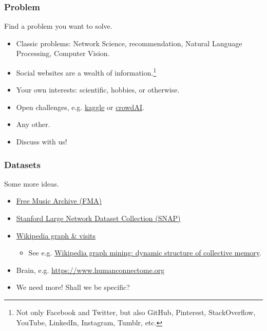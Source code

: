 \documentclass{beamer}
\newcommand{\todo}[1]{{\color{red} #1}}
\begin{document}

\begin{frame}
	\frametitle{Problem}
	\begin{center}
		Find a problem you want to solve.
	\end{center}
	\vfill
	\begin{itemize}
		\item Classic problems: Network Science, recommendation, Natural
			Language Processing, Computer Vision.
		\vfill
		\item Social websites are a wealth of information.\footnote{Not only
			Facebook and Twitter, but also GitHub, Pinterest, StackOverflow,
			YouTube, LinkedIn, Instagram, Tumblr, etc.}
		\vfill
		\item Your own interests: scientific, hobbies, or otherwise.
		\vfill
		\item Open challenges, e.g. \href{https://www.kaggle.com/}{kaggle} or \href{https://www.crowdai.org/}{crowdAI}.
		\vfill
		\item Any other.
		\vfill
		\item Discuss with us!
	\end{itemize}
\end{frame}


\begin{frame}
	\frametitle{Datasets}
	\begin{center}
		Some more ideas.
	\end{center}
	\vfill
	\begin{itemize}
		\item \href{https://github.com/mdeff/fma}{Free Music Archive (FMA)}
		\item \href{http://snap.stanford.edu/data/index.html}{Stanford Large Network Dataset Collection (SNAP)}
		\item \href{https://doi.org/10.5281/zenodo.886484}{Wikipedia graph \& visits}
			\begin{itemize}
				\item See e.g. \href{http://blog.miz.space/research/2017/08/14/wikipedia-collective-memory-dynamic-graph-analysis-graphx-spark-scala-time-series-network/}{Wikipedia graph mining: dynamic structure of collective memory}.
			\end{itemize}
		\item Brain, e.g. \url{https://www.humanconnectome.org}
		\item \todo{We need more! Shall we be specific?}
	\end{itemize}
\end{frame}
\end{document}
